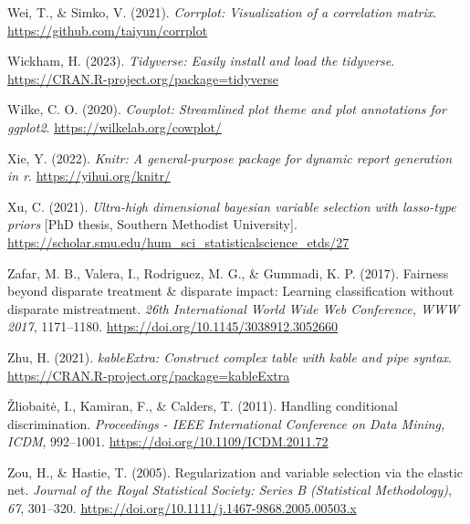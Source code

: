 \documentclass[
  11pt,
]{article}
\newlength{\cslhangindent}
\newlength{\cslentryspacingunit} %
\newenvironment{CSLReferences}[2] %
 {%
  \setlength{\parindent}{0pt}
  \ifodd #1
  \let\oldpar\par
  \def\par{\hangindent=\cslhangindent\oldpar}
  \fi
  \setlength{\parskip}{#2\cslentryspacingunit}
 }%
 {}
\begin{document}
\begin{CSLReferences}{1}{0}
\leavevmode{}%
Wei, T., \& Simko, V. (2021). \emph{Corrplot: Visualization of a
correlation matrix}. \url{https://github.com/taiyun/corrplot}

\leavevmode{}%
Wickham, H. (2023). \emph{Tidyverse: Easily install and load the
tidyverse}. \url{https://CRAN.R-project.org/package=tidyverse}

\leavevmode{}%
Wilke, C. O. (2020). \emph{Cowplot: Streamlined plot theme and plot
annotations for ggplot2}. \url{https://wilkelab.org/cowplot/}

\leavevmode{}%
Xie, Y. (2022). \emph{Knitr: A general-purpose package for dynamic
report generation in r}. \url{https://yihui.org/knitr/}

\leavevmode{}%
Xu, C. (2021). \emph{Ultra-high dimensional bayesian variable selection
with lasso-type priors} {[}PhD thesis, Southern Methodist University{]}.
\url{https://scholar.smu.edu/hum_sci_statisticalscience_etds/27}

\leavevmode{}%
Zafar, M. B., Valera, I., Rodriguez, M. G., \& Gummadi, K. P. (2017).
Fairness beyond disparate treatment \& disparate impact: Learning
classification without disparate mistreatment. \emph{26th International
World Wide Web Conference, WWW 2017}, 1171--1180.
\url{https://doi.org/10.1145/3038912.3052660}

\leavevmode{}%
Zhu, H. (2021). \emph{kableExtra: Construct complex table with kable and
pipe syntax}. \url{https://CRAN.R-project.org/package=kableExtra}

\leavevmode{}%
Žliobaitė, I., Kamiran, F., \& Calders, T. (2011). Handling conditional
discrimination. \emph{Proceedings - IEEE International Conference on
Data Mining, ICDM}, 992--1001.
\url{https://doi.org/10.1109/ICDM.2011.72}

\leavevmode{}%
Zou, H., \& Hastie, T. (2005). Regularization and variable selection via
the elastic net. \emph{Journal of the Royal Statistical Society: Series
B (Statistical Methodology)}, \emph{67}, 301--320.
\url{https://doi.org/10.1111/j.1467-9868.2005.00503.x}

\end{CSLReferences}
\end{document}
